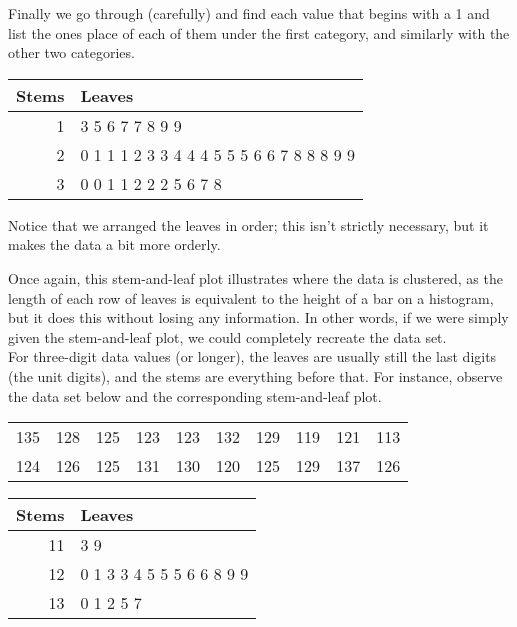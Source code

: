 Finally we go through (carefully) and find each value that begins with a 1 and list the ones place of each of them under the first category, and similarly with the other two categories.
\begin{center}
\begin{tabular}{r | l}
Stems & Leaves\\
\hline
1 & 3 5 6 7 7 8 9 9\\
2 & 0 1 1 1 2 3 3 4 4 4 5 5 5 6 6 7 8 8 8 9 9\\
3 & 0 0 1 1 2 2 2 5 6 7 8
\end{tabular}
\end{center}

Notice that we arranged the leaves in order; this isn't strictly necessary, but it makes the data a bit more orderly.

Once again, this stem-and-leaf plot illustrates where the data is clustered, as the length of each row of leaves is equivalent to the height of a bar on a histogram, but it does this without losing any information.  In other words, if we were simply given the stem-and-leaf plot, we could completely recreate the data set.\\

For three-digit data values (or longer), the leaves are usually still the last digits (the unit digits), and the stems are everything before that.  For instance, observe the data set below and the corresponding stem-and-leaf plot.

\begin{center}
\begin{tabular}{c c c c c c c c c c}
135 & 128 & 125 & 123 & 123 & 132 & 129 & 119 & 121 & 113\\
124 & 126 & 125 & 131 & 130 & 120 & 125 & 129 & 137 & 126\\
\end{tabular}
\end{center}

\begin{center}
\begin{tabular}{r | l}
Stems & Leaves\\
\hline
11 & 3 9\\
12 & 0 1 3 3 4 5 5 5 6 6 8 9 9\\
13 & 0 1 2 5 7
\end{tabular}
\end{center}







